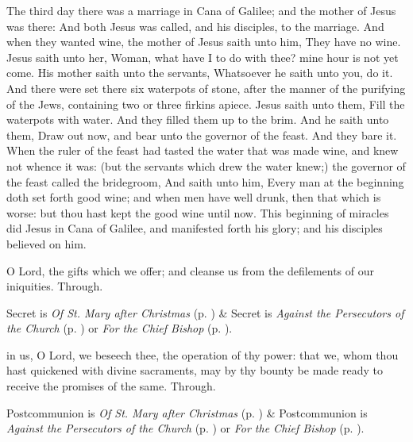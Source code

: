  The third day there was a marriage in Cana of Galilee; and the mother of Jesus was there: And both Jesus was called, and his disciples, to the marriage. And when they wanted wine, the mother of Jesus saith unto him, They have no wine. Jesus saith unto her, Woman, what have I to do with thee? mine hour is not yet come. His mother saith unto the servants, Whatsoever he saith unto you, do it. And there were set there six waterpots of stone, after the manner of the purifying of the Jews, containing two or three firkins apiece. Jesus saith unto them, Fill the waterpots with water. And they filled them up to the brim. And he saith unto them, Draw out now, and bear unto the governor of the feast. And they bare it. When the ruler of the feast had tasted the water that was made wine, and knew not whence it was: (but the servants which drew the water knew;) the governor of the feast called the bridegroom, And saith unto him, Every man at the beginning doth set forth good wine; and when men have well drunk, then that which is worse: but thou hast kept the good wine until now. This beginning of miracles did Jesus in Cana of Galilee, and manifested forth his glory; and his disciples believed on him.

\secret
{} O Lord, the gifts which we offer; and cleanse us from the defilements of our iniquities. Through.
\begin{rubric}
     Secret is \emph{Of St. Mary after Christmas} (p. \pageref{SPMaryPostChristmas}) \&  Secret is \emph{Against the Persecutors of the Church} (p. \pageref{SPAgainst}) or \emph{For the Chief Bishop} (p. \pageref{SPChiefBishop}).
\end{rubric}
\postcommunion
{} in us, O Lord, we beseech thee, the operation of thy power: that we, whom thou hast quickened with divine sacraments, may by thy bounty be made ready to receive the promises of the same. Through.
\begin{rubric}
     Postcommunion is \emph{Of St. Mary after Christmas} (p. \pageref{SPMaryPostChristmas}) \&  Postcommunion is \emph{Against the Persecutors of the Church} (p. \pageref{SPAgainst}) or \emph{For the Chief Bishop} (p. \pageref{SPChiefBishop}).
\end{rubric}


